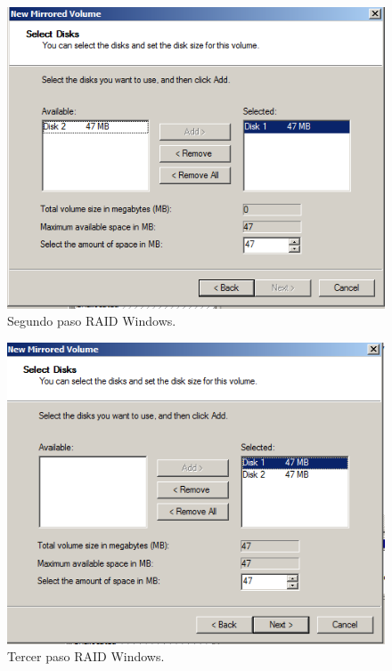 \begin{figure}[H]
	\centering
	\includegraphics[scale=0.75]{RAIDW2.png}
	\caption{Segundo paso RAID Windows. \label{fig:figura6}}
\end{figure}

\begin{figure}[H]
	\centering
	\includegraphics[scale=0.75]{RAIDW3.png}
	\caption{Tercer paso RAID Windows. \label{fig:figura7}}
\end{figure}

